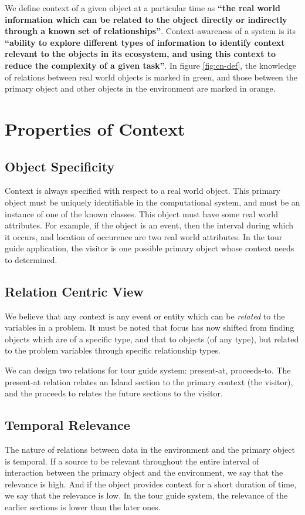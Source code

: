 We define context of a given object at a particular time as \textbf{``the real world information which can be related to the object directly or indirectly through a known set of relationships''}. Context-awareness of a system is its \textbf{``ability to explore different types of information to identify context relevant to the objects in its ecosystem, and using this context to reduce the complexity of a given task''}. In figure \ref{fig:cn-def}, the knowledge of relations between real world objects is marked in green, and those between the primary object and other objects in the environment are marked in orange.

\section{Properties of Context}
\subsection{Object Specificity}
Context is always specified with respect to a real world object. This primary object must be uniquely identifiable in the computational system, and must be an instance of one of the known classes. This object must have some real world attributes. For example, if the object is an event, then the interval during which it occurs, and location of occurence are two real world attributes. In the tour guide application, the visitor is one possible primary object whose context needs to determined.

\subsection{Relation Centric View}
We believe that any context is any event or entity which can be \textit{related} to the variables in a problem. It must be noted that focus has now shifted from finding objects which are of a specific type, and that to objects (of any type), but related to the problem variables through specific relationship types.

We can design two relations for tour guide system: present-at, proceeds-to. The present-at relation relates an Island section to the primary context (the visitor), and the proceeds to relates the future sections to the visitor. 

\subsection{Temporal Relevance}
The nature of relations between data in the environment and the primary object is temporal. If a source to be relevant throughout the entire interval of interaction between the primary object and the environment, we say that the relevance is high. And if the object provides context for a short duration of time, we say that the relevance is low. In the tour guide system, the relevance of the earlier sections is lower than the later ones.

